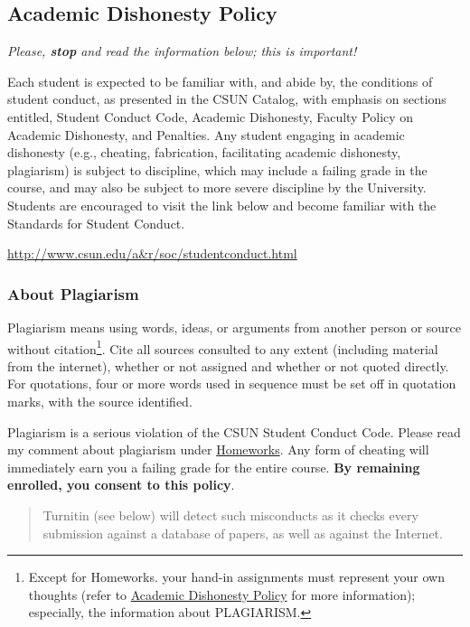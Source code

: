 \documentclass[11pt,]{article}
\begin{document}
\hypertarget{dishonesty}{%
\subsection{Academic Dishonesty Policy}\label{dishonesty}}

\emph{Please, \textbf{stop} and read the information below; this is
important!}

Each student is expected to be familiar with, and abide by, the
conditions of student conduct, as presented in the CSUN Catalog, with
emphasis on sections entitled, Student Conduct Code, Academic
Dishonesty, Faculty Policy on Academic Dishonesty, and Penalties. Any
student engaging in academic dishonesty (e.g., cheating, fabrication,
facilitating academic dishonesty, plagiarism) is subject to discipline,
which may include a failing grade in the course, and may also be subject
to more severe discipline by the University. Students are encouraged to
visit the link below and become familiar with the Standards for Student
Conduct.

\url{http://www.csun.edu/a\&r/soc/studentconduct.html}

\hypertarget{about-plagiarism}{%
\subsubsection{About Plagiarism}\label{about-plagiarism}}

Plagiarism means using words, ideas, or arguments from another person or
source without citation\footnote{Except for Homeworks. your hand-in
  assignments must represent your own thoughts (refer to
  \protect\hyperlink{dishonesty}{Academic Dishonesty Policy} for more
  information); especially, the information about PLAGIARISM.}. Cite all
sources consulted to any extent (including material from the internet),
whether or not assigned and whether or not quoted directly. For
quotations, four or more words used in sequence must be set off in
quotation marks, with the source identified.

Plagiarism is a serious violation of the CSUN Student Conduct Code.
Please read my comment about plagiarism under
\protect\hyperlink{homeworks}{Homeworks}. Any form of cheating will
immediately earn you a failing grade for the entire course. \textbf{By
remaining enrolled, you consent to this policy}.

\begin{quote}
Turnitin (see below) will detect such misconducts as it checks every
submission against a database of papers, as well as against the
Internet.
\end{quote}
\end{document}
